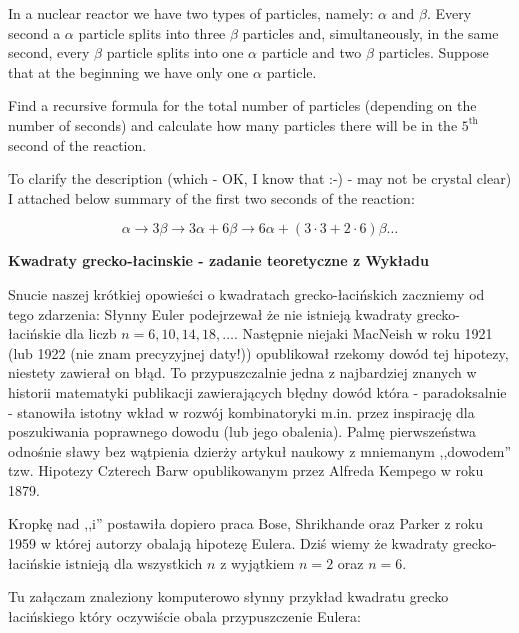 \documentclass[12pt]{article} %
\newcounter{zad}
\def\numzad{\smallskip\noindent\refstepcounter{zad}{\bf Zadanie \thezad.} }
\begin{document}
In a nuclear reactor we have two types of particles, namely:
$\alpha$ and $\beta$. Every second a $\alpha$ particle
splits into three $\beta$ particles and, simultaneously, in the
same second, every $\beta$ particle splits
into one $\alpha$ particle and two $\beta$ particles.
Suppose that at the beginning we have only one $\alpha$ particle.

  Find a recursive formula for the total number of particles
(depending on the number of seconds)  and calculate how many particles
there will be in the $5^{\mathrm{th}}$ second of the reaction.

  To clarify the description (which - OK, I know that :-) -
may not be crystal clear) I attached below
summary of the first two seconds of the reaction:

\[
\alpha \rightarrow 3 \beta \rightarrow 3 \alpha + 6 \beta \rightarrow
6 \alpha + (3 \cdot 3 + 2 \cdot 6) \beta \ldots
\]

\numzad
\begin{flushleft}{\bf Kwadraty grecko-łacinskie - zadanie teoretyczne z Wykładu}
\end{flushleft}
Snucie naszej krótkiej opowieści o kwadratach grecko-łacińskich
zaczniemy od tego zdarzenia: Słynny Euler podejrzewał
że nie istnieją kwadraty grecko-łacińskie dla liczb $n = 6, 10, 14, 18, \ldots$.
  Następnie niejaki MacNeish w roku 1921 (lub 1922 (nie znam precyzyjnej daty!))
opublikował rzekomy dowód tej hipotezy, niestety zawierał on błąd.
  To przypuszczalnie jedna z najbardziej znanych w historii matematyki
publikacji zawierających błędny dowód która - paradoksalnie - stanowiła
istotny wkład w rozwój kombinatoryki m.in. przez inspirację
dla poszukiwania poprawnego dowodu (lub jego obalenia). Palmę
pierwszeństwa odnośnie sławy bez wątpienia dzierży artykuł naukowy
z mniemanym ,,dowodem'' tzw. Hipotezy Czterech Barw opublikowanym przez Alfreda Kempego w roku 1879.

Kropkę nad ,,i'' postawiła dopiero praca  Bose, Shrikhande oraz Parker z roku
1959 w której autorzy obalają hipotezę Eulera.
Dziś wiemy że kwadraty grecko-łacińskie istnieją
dla wszystkich $n$ z wyjątkiem $n = 2$ oraz $n = 6$.

  Tu załączam znaleziony komputerowo słynny przykład kwadratu grecko łacińskiego
który oczywiście obala przypuszczenie Eulera:
\end{document}
